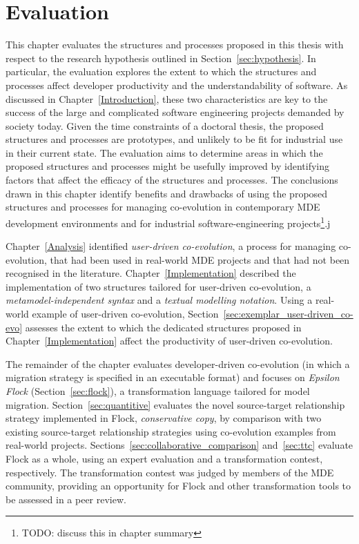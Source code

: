 
\chapter{Evaluation}
\label{Evaluation}
This chapter evaluates the structures and processes proposed in this thesis with respect to the research hypothesis outlined in Section~\ref{sec:hypothesis}. In particular, the evaluation explores the extent to which the structures and processes affect developer productivity and the understandability of software. As discussed in Chapter~\ref{Introduction}, 
these two characteristics are key to the success of the large and complicated software engineering projects demanded by society today. Given the time constraints of a doctoral thesis, the proposed structures and processes are prototypes, and unlikely to be fit for industrial use in their current state. The evaluation aims to determine areas in which the proposed structures and processes might be usefully improved by identifying factors that affect the efficacy of the structures and processes. The conclusions drawn in this chapter identify benefits and drawbacks of using the proposed structures and processes for managing co-evolution in contemporary MDE development environments and for industrial software-engineering projects\footnote{TODO: discuss this in chapter summary}.j

Chapter~\ref{Analysis} identified \emph{user-driven co-evolution}, a process for managing co-evolution, that had been used in real-world MDE projects and that had not been recognised in the literature. Chapter~\ref{Implementation} described the implementation of two structures tailored for user-driven co-evolution, a \emph{metamodel-independent syntax} and a \emph{textual modelling notation}. Using a real-world example of user-driven co-evolution, Section~\ref{sec:exemplar_user-driven_co-evo} assesses the extent to which the dedicated structures proposed in Chapter~\ref{Implementation} affect the productivity of user-driven co-evolution.

The remainder of the chapter evaluates developer-driven co-evolution (in which a migration strategy is specified in an executable format) and focuses on \emph{Epsilon Flock} (Section~\ref{sec:flock}), a transformation language tailored for model migration. Section~\ref{sec:quantitive} evaluates the novel source-target relationship strategy implemented in Flock, \emph{conservative copy}, by comparison with two existing source-target relationship strategies using co-evolution examples from real-world projects. Sections~\ref{sec:collaborative_comparison} and~\ref{sec:ttc} evaluate Flock as a whole, using an expert evaluation and a transformation contest, respectively. The transformation contest was judged by members of the MDE community, providing an opportunity for Flock and other transformation tools to be assessed in a peer review.

